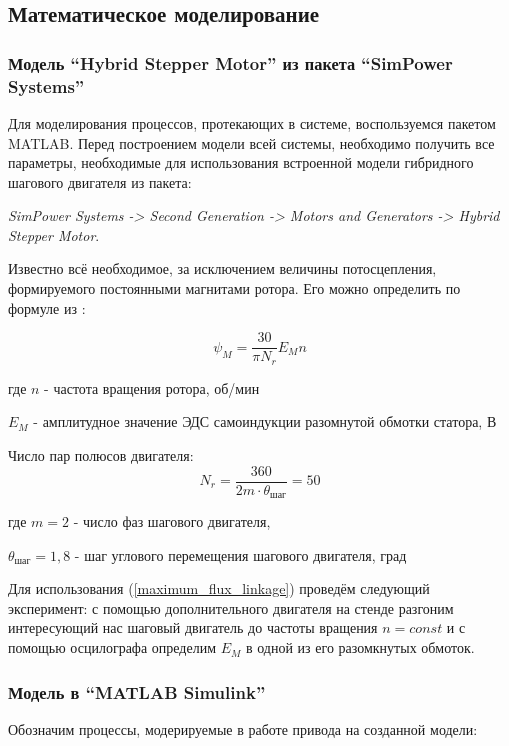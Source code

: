 \subsection{Математическое моделирование}

\subsubsection{Модель ``Hybrid Stepper Motor'' из пакета ``SimPower Systems''}

Для моделирования процессов, протекающих в системе, воспользуемся пакетом MATLAB.
Перед построением модели всей системы, необходимо получить все параметры,
необходимые для использования встроенной модели гибридного шагового двигателя из пакета:

\textit{SimPower Systems -> Second Generation -> Motors and Generators -> Hybrid Stepper Motor}.

Известно всё необходимое, за исключением величины потосцепления, формируемого
постоянными магнитами ротора. Его можно определить по формуле
из \cite{Matlab_help_stepper_motor}:

\begin{equation}
    \label{maximum_flux_linkage}
    \psi_{M} = \frac{30}{\pi N_{r}} E_{M} n
\end{equation}

где $n$ - частота вращения ротора, об/мин

$E_{M}$ - амплитудное значение ЭДС самоиндукции разомнутой обмотки статора, В
\vspace{\baselineskip}

Число пар полюсов двигателя:
$$
N_{r} = \frac{360}{2m \cdot \theta_\textit{шаг}} = 50
$$

где $m = 2$ - число фаз шагового двигателя,

$\theta_\textit{шаг} = 1,8$ - шаг углового перемещения шагового двигателя, град

Для использования (\ref{maximum_flux_linkage}) проведём следующий эксперимент:
с помощью дополнительного двигателя на стенде разгоним интересующий нас шаговый
двигатель до частоты вращения $n = const$ и с помощью осцилографа определим $E_{M}$
в одной из его разомкнутых обмоток.

\subsubsection{Модель в ``MATLAB Simulink''}
Обозначим процессы, модерируемые в работе привода на созданной модели:


